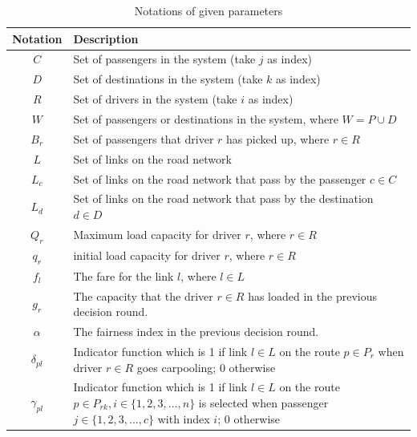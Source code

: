 \renewcommand\arraystretch{1.5}
\par
\begin{table}[ht]
  \centering
  \caption{Notations of given parameters}
  \begin{tabularx}{\textwidth}{cX}
  \toprule
  Notation & Description \\
  \midrule
    $C$ & Set of passengers in the system (take $j$ as index) \\
    $D$ & Set of destinations in the system (take $k$ as index) \\
    $R$ & Set of drivers in the system (take $i$ as index) \\
    $W$ & Set of passengers or destinations in the system, where $W = P \cup D$ \\
    $B_r$ & Set of passengers that driver $r$ has picked up, where $r \in R$ \\
    $L$ & Set of links on the road network \\
    $L_c$ & Set of links on the road network that pass by the passenger $c \in C$ \\
    $L_d$ & Set of links on the road network that pass by the destination $d \in D$ \\
    $Q_r$ & Maximum load capacity for driver $r$, where $r \in R$ \\
    $q_r$ & initial load capacity for driver $r$, where $r \in R$ \\
    $f_l$ & The fare for the link $l$, where $l \in L$ \\
    $g_r$ & The capacity that the driver $r \in R$ has loaded in the previous decision round. \\
    $\alpha$ & The fairness index in the previous decision round. \\
    $\delta_{pl}$ & Indicator function which is 1 if link $l \in L$ on the route $p \in P_r$ when driver $r \in R$ goes carpooling; 0 otherwise \\
    $\gamma_{pl}$ & Indicator function which is 1 if link $l \in L$ on the route $p \in P_{rk}, i \in \{1,2,3,...,n\}$ is selected when passenger $j \in \{1,2,3,...,c\}$ with index $i$; 0 otherwise \\
  \bottomrule
  \end{tabularx}
\end{table}  
\par

